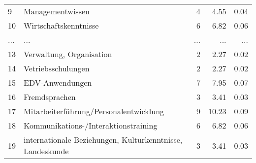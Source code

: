 \begin{longtable}{lXrrr}
        9 & \multicolumn{1}{X}{Managementwissen} & %
          \num{4} &
          \num[round-mode=places,round-precision=2]{4,55} &
          \num[round-mode=places,round-precision=2]{0,04} \\
        10 & \multicolumn{1}{X}{Wirtschaftskenntnisse} & %
          \num{6} &
          \num[round-mode=places,round-precision=2]{6,82} &
          \num[round-mode=places,round-precision=2]{0,06} \\
       ... & ... & ... & ... & ... \\
        13 & \multicolumn{1}{X}{Verwaltung, Organisation} & %
          \num{2} &
          \num[round-mode=places,round-precision=2]{2,27} &
          \num[round-mode=places,round-precision=2]{0,02} \\

        14 & \multicolumn{1}{X}{Vetriebsschulungen} & %
          \num{2} &
          \num[round-mode=places,round-precision=2]{2,27} &
          \num[round-mode=places,round-precision=2]{0,02} \\

        15 & \multicolumn{1}{X}{EDV-Anwendungen} & %
          \num{7} &
          \num[round-mode=places,round-precision=2]{7,95} &
          \num[round-mode=places,round-precision=2]{0,07} \\

        16 & \multicolumn{1}{X}{Fremdsprachen} & %
          \num{3} &
          \num[round-mode=places,round-precision=2]{3,41} &
          \num[round-mode=places,round-precision=2]{0,03} \\

        17 & \multicolumn{1}{X}{Mitarbeiterführung/Personalentwicklung} & %
          \num{9} &
          \num[round-mode=places,round-precision=2]{10,23} &
          \num[round-mode=places,round-precision=2]{0,09} \\

        18 & \multicolumn{1}{X}{Kommunikations-/Interaktionstraining} & %
          \num{6} &
          \num[round-mode=places,round-precision=2]{6,82} &
          \num[round-mode=places,round-precision=2]{0,06} \\

        19 & \multicolumn{1}{X}{internationale Beziehungen, Kulturkenntnisse, Landeskunde} & %
          \num{3} &
          \num[round-mode=places,round-precision=2]{3,41} &
          \num[round-mode=places,round-precision=2]{0,03} \\


\end{longtable}
